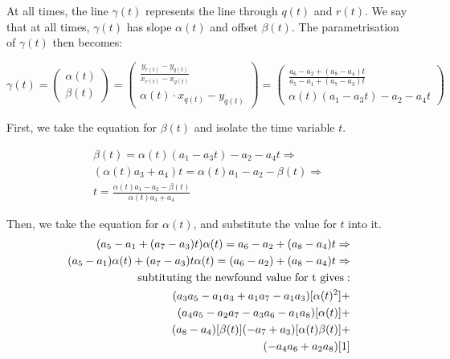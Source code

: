 \documentclass{article}
\begin{document}
At all times, the line $\gamma(t)$ represents the line through $q(t)$ and $r(t)$. We say that at all times, $\gamma(t)$ has slope $\alpha(t)$ and offset $\beta(t)$. The parametrisation of $\gamma(t)$ then becomes:

\begin{equation}
\label{eq:curve}
   \gamma(t) = \left( \begin{array}{c}
         \alpha(t)  \\
         \beta(t) 
    \end{array}  \right) = 
    \left( \begin{array}{c}
         \frac{y_{r(t)} - y_{q(t)}}{x_{r(t)} - x_{q(t)}}  \\
         \alpha(t)\cdot x_{q(t)} - y_{q(t)}
    \end{array}  \right) =
    \left( \begin{array}{c}
         \frac{ a_6 - a_2 + (a_8 - a_4) t}
      { a_5 - a_1  + (a_7 - a_3) t }  \\
         \alpha(t)(a_1 - a_3 t) - a_2 - a_4 t 
    \end{array}  \right)
  \end{equation}
  
  First, we take the equation for $\beta(t)$ and isolate the time variable $t$.
  
\begin{align*}
    \beta(t) =  \alpha(t)(a_1 - a_3 t) - a_2 - a_4 t \Rightarrow \\
   (\alpha(t) a_3 + a_4) t = \alpha(t) a_1 - a_2  - \beta(t) \Rightarrow \\
   t = \frac{\alpha(t) a_1 - a_2  - \beta(t)}{\alpha(t) a_3 + a_4}
\end{align*}

Then, we take the equation for $\alpha(t)$, and substitute the value for $t$ into it.
\begin{align*}
    ( a_5 - a_1  + (a_7 - a_3) t) \alpha(t) =  a_6 - a_2 + (a_8 - a_4) t \Rightarrow \\
    (a_5 - a_1) \alpha(t) + (a_7 - a_3) t \alpha(t) = (a_6 - a_2) + (a_8 - a_4) t \Rightarrow \\
    \textnormal{subtituting the newfound value for t gives}: \\
    (a_3 a_5 - a_1 a_3 + a_1 a_7 - a_1 a_3)[\alpha(t)^2] + \\
    (a_4 a_5- a_2 a_7 - a_3 a_6  - a_1 a_8) [\alpha(t)] + \\
    (a_8 - a_4) [\beta(t)]    (- a_7 + a_3)[\alpha(t)\beta(t)] + \\
    (-a_4 a_6  + a_2 a_8)[1]
\end{align*}
\end{document}
